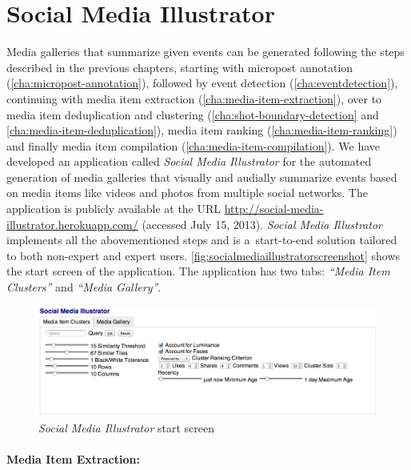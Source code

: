 \section{Social Media Illustrator}
\label{sec:socialmediaillustrator}

Media galleries that summarize given events
can be generated following the steps described in the previous chapters,
starting with micropost annotation (\autoref{cha:micropost-annotation}),
followed by event detection (\autoref{cha:eventdetection}),
continuing with media item extraction
(\autoref{cha:media-item-extraction}),
over to media item deduplication and clustering
(\autoref{cha:shot-boundary-detection} and
\autoref{cha:media-item-deduplication}),
media item ranking (\autoref{cha:media-item-ranking}) and
finally media item compilation (\autoref{cha:media-item-compilation}).
We have developed an application called \emph{Social Media Illustrator}
for the automated generation of
media galleries that visually and audially summarize events
based on media items like videos and photos from multiple social networks.
The application is publicly available at the URL
\url{http://social-media-illustrator.herokuapp.com/} (accessed July 15, 2013).
\emph{Social Media Illustrator} implements all the abovementioned steps
and is a~start-to-end solution tailored to both
non-expert and expert users.
\autoref{fig:socialmediaillustratorscreenshot}
shows the start screen of the application.
The application has two tabs: \emph{``Media Item Clusters''} and \emph{``Media Gallery''}.

\begin{figure}[!ht]
  \centering
  \includegraphics[width=1\columnwidth]{socialmediaillustrator.png}
  \caption{\emph{Social Media Illustrator} start screen}
  \label{fig:socialmediaillustratorscreenshot}
\end{figure}

\paragraph{Media Item Extraction:}


